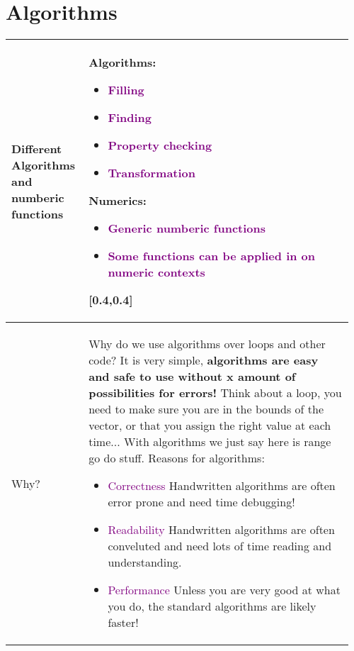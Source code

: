 \documentclass[main.tex,fontsize=8pt,paper=a4,paper=portrait,DIV=calc,]{scrartcl}
\begin{document}
\begin{table}[ht!]
\section{Algorithms}
\begin{tabular}{|m{0.2\linewidth}|m{0.755\linewidth}|}
\hline 
Different Algorithms and numberic functions & 
\minipg{
Algorithms:\newline
\begin{itemize}
\item \textcolor{purple}{Filling}
\item \textcolor{purple}{Finding}
\item \textcolor{purple}{Property checking}
\item \textcolor{purple}{Transformation}
\end{itemize} 
}{
Numerics:\newline
\begin{itemize}
\item \textcolor{purple}{Generic numberic functions}
\item \textcolor{purple}{Some functions can be applied in on numeric contexts}
\end{itemize} 
}[0.4,0.4]\\
\hline
Why? & 
Why do we use algorithms over loops and other code?\newline
It is very simple, \textbf{algorithms are easy and safe to use without x amount of possibilities for errors!}\newline
Think about a loop, you need to make sure you are in the bounds of the vector, or that you assign the right value at each time...\newline
With algorithms we just say here is range go do stuff.
Reasons for algorithms:\newline
\begin{itemize}
\item \textcolor{purple}{Correctness}\newline
  Handwritten algorithms are often error prone and need time debugging!
\item \textcolor{purple}{Readability}\newline
  Handwritten algorithms are often conveluted and need lots of time reading and understanding.
\item \textcolor{purple}{Performance}\newline
  Unless you are very good at what you do, the standard algorithms are likely faster!
\vspace{-3mm}
\end{itemize} 

\end{tabular}
\end{table}
\end{document}
